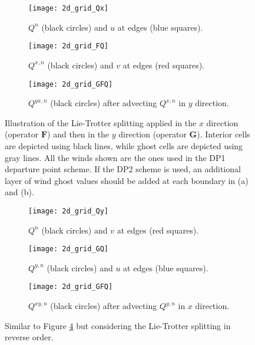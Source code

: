 \begin{figure}[!htb]
	\centering
	\begin{subfigure}{0.3\textwidth}
		\centering
		\texttt{[image: 2d\_grid\_Qx]}
		\caption{$Q^n$ (black circles) and $u$ at edges (blue squares). \label{lt-Qx}}
	\end{subfigure}
	\begin{subfigure}{0.3\textwidth}
		\centering
		\texttt{[image: 2d\_grid\_FQ]}
		\caption{$Q^{x,n}$ (black circles) and $v$ at edges (red squares).\label{lt-FQx} }
	\end{subfigure}
	\begin{subfigure}{0.3\textwidth}
	    \centering
	    \texttt{[image: 2d\_grid\_GFQ]}
		\caption{$Q^{yx,n}$ (black circles) after advecting $Q^{x,n}$ in $y$ direction. \label{lt-GFQx}}
    \end{subfigure}
	\caption{Illustration of the Lie-Trotter splitting applied in the $x$ direction (operator $\mathbf{F}$)
	and then in the $y$ direction (operator $\mathbf{G}$). Interior cells are depicted using black lines,
	 while ghost cells are depicted using gray lines. 
	 All the winds shown are the ones used in the DP1 departure point scheme.
	 If the DP2 scheme is used, an additional layer of wind ghost values should be added at each boundary in (a) and (b). \label{ltxdir}}
\end{figure}


\begin{figure}[!htb]
	\centering
	\begin{subfigure}{0.3\textwidth}
		\centering
		\texttt{[image: 2d\_grid\_Qy]}
		\caption{$Q^n$ (black circles) and $v$ at edges (red squares). \label{lt-Qy}}
	\end{subfigure}
	\begin{subfigure}{0.3\textwidth}
		\centering
		\texttt{[image: 2d\_grid\_GQ]}
		\caption{$Q^{y,n}$ (black circles) and $u$ at edges (blue squares).\label{lt-GQy} }
	\end{subfigure}
	\begin{subfigure}{0.3\textwidth}
		\centering
		\texttt{[image: 2d\_grid\_GFQ]}
		\caption{$Q^{xy,n}$ (black circles) after advecting $Q^{y,n}$ in $x$ direction. \label{lt-FGQy}}
	\end{subfigure}
	\caption{Similar to Figure \ref{ltxdir} but considering the Lie-Trotter splitting in reverse order.}
\end{figure}

